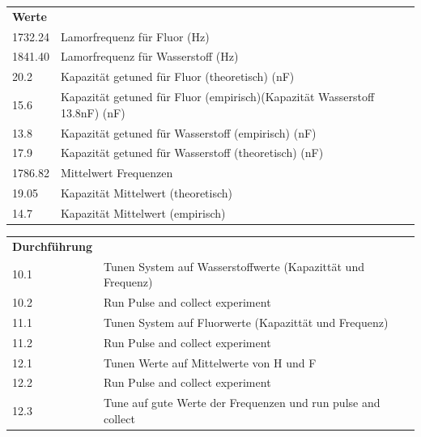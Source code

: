 \begin{tabular}{ll}

    {\bf Werte} &            \\
    
       1732.24 & Lamorfrequenz für Fluor (Hz) \\
    
       1841.40 & Lamorfrequenz für Wasserstoff (Hz) \\
    
          20.2 & Kapazität getuned für Fluor (theoretisch) (nF) \\
    
          15.6 & Kapazität getuned für Fluor (empirisch)(Kapazität Wasserstoff 13.8nF) (nF) \\
    
          13.8 & Kapazität getuned für Wasserstoff (empirisch) (nF) \\
    
          17.9 & Kapazität getuned für Wasserstoff (theoretisch) (nF) \\
    
       1786.82 & Mittelwert Frequenzen \\
    
         19.05 & Kapazität Mittelwert (theoretisch) \\
    
          14.7 & Kapazität Mittelwert (empirisch) \\
    
    \end{tabular}  


    \vspace{1cm}




\begin{tabular}{ll}

    \textbf{Durchführung} & \\
    10.1 & Tunen System auf Wasserstoffwerte (Kapazittät und Frequenz) \\

    10.2 & Run Pulse and collect experiment \\

    11.1 & Tunen System auf Fluorwerte (Kapazittät und Frequenz) \\

    11.2 & Run Pulse and collect experiment \\

    12.1 & Tunen Werte auf Mittelwerte von H und F \\

    12.2 & Run Pulse and collect experiment \\

    12.3 & Tune auf gute Werte der Frequenzen und run pulse and collect\\

\end{tabular}  

